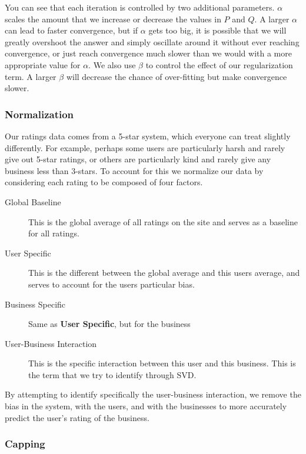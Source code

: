 You can see that each iteration is controlled by two additional parameters.
$\alpha$ scales the amount that we increase or decrease the values in $P$ and
$Q$. A larger $\alpha$ can lead to faster convergence, but if $\alpha$ gets too
big, it is possible that we will greatly overshoot the answer and simply
oscillate around it without ever reaching convergence, or just reach
convergence much slower than we would with a more appropriate value for
$\alpha$. We also use $\beta$ to control the effect of our regularization term.
A larger $\beta$ will decrease the chance of over-fitting but make convergence
slower.

\subsubsection{Normalization}

Our ratings data comes from a 5-star system, which everyone can treat slightly
differently. For example, perhaps some users are particularly harsh and rarely
give out 5-star ratings, or others are particularly kind and rarely give any
business less than 3-stars. To account for this we normalize our data by
considering each rating to be composed of four factors\cite{bellkor}.

\begin{description}

  \item[Global Baseline] This is the global average of all ratings on the site
and serves as a baseline for all ratings.

  \item[User Specific] This is the different between the global average and
this users average, and serves to account for the users particular bias.

  \item[Business Specific] Same as \textbf{User Specific}, but for the business

  \item[User-Business Interaction] This is the specific interaction between this
user and this business. This is the term that we try to identify through SVD. 

\end{description}

By attempting to identify specifically the user-business interaction, we remove
the bias in the system, with the users, and with the businesses to more
accurately predict the user's rating of the business. 

\subsubsection{Capping}

